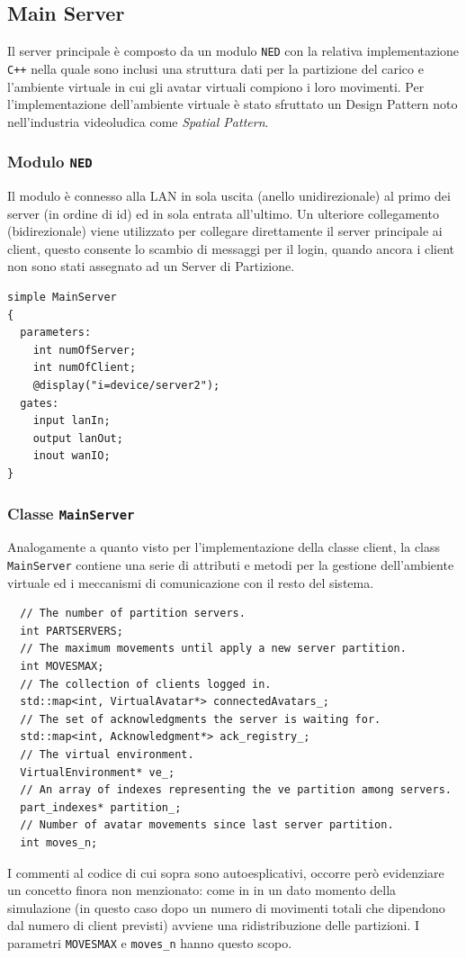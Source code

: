 \documentclass[a4paper, 11pt, oneside]{book}
\theoremstyle{definition}
\theoremstyle{remark}
\begin{document}
\subsection{Main Server}
Il server principale è composto da un modulo \texttt{NED} con la relativa
implementazione \texttt{C++} nella quale sono inclusi una struttura dati per
la partizione del carico e l'ambiente virtuale in cui gli avatar virtuali
compiono i loro movimenti. Per l'implementazione dell'ambiente virtuale è stato
sfruttato un Design Pattern noto nell'industria videoludica
\cite{GamePattern}
come \emph{Spatial Pattern}.

\subsubsection{Modulo \texttt{NED}}
Il modulo è connesso alla LAN in sola uscita (anello unidirezionale) al primo
dei server (in ordine di id) ed in sola entrata all'ultimo. Un ulteriore
collegamento (bidirezionale) viene utilizzato per collegare direttamente
il server principale ai client, questo consente lo scambio di messaggi per
il login, quando ancora i client non sono stati assegnato ad un Server di
Partizione.
\begin{lstlisting}
simple MainServer
{
  parameters:
    int numOfServer;
    int numOfClient;
    @display("i=device/server2");
  gates:
    input lanIn;
    output lanOut;
    inout wanIO;
}
\end{lstlisting}

\subsubsection{Classe \texttt{MainServer}}
Analogamente a quanto visto per l'implementazione della classe client, la
class \texttt{MainServer} contiene una serie di attributi e metodi per
la gestione dell'ambiente virtuale ed i meccanismi di comunicazione con
il resto del sistema.
\begin{lstlisting}
  // The number of partition servers.
  int PARTSERVERS;
  // The maximum movements until apply a new server partition.
  int MOVESMAX;
  // The collection of clients logged in.
  std::map<int, VirtualAvatar*> connectedAvatars_;
  // The set of acknowledgments the server is waiting for.
  std::map<int, Acknowledgment*> ack_registry_;
  // The virtual environment.
  VirtualEnvironment* ve_;
  // An array of indexes representing the ve partition among servers.
  part_indexes* partition_;
  // Number of avatar movements since last server partition.
  int moves_n;
\end{lstlisting}
I commenti al codice di cui sopra sono autoesplicativi, occorre però evidenziare
un concetto finora non menzionato: come in \cite{IDVE} in un dato momento
della simulazione (in questo caso dopo un numero di movimenti totali che
dipendono dal numero di client previsti) avviene una ridistribuzione delle
partizioni. I parametri \texttt{MOVESMAX} e \texttt{moves\_n} hanno questo
scopo.
\end{document}
